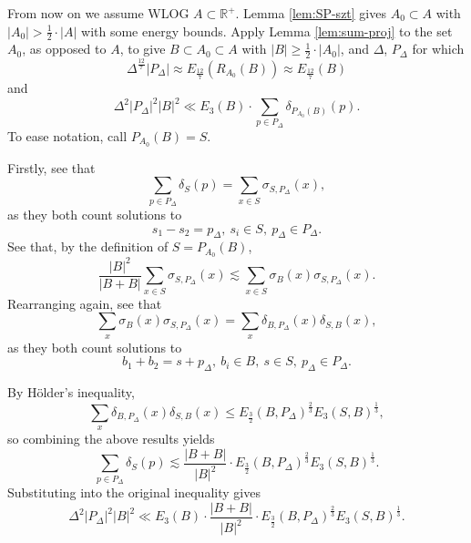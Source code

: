\documentclass[reqno]{amsart}
\newcommand{\holder}{H\"older}
\numberwithin{equation}{section}
\begin{document}
From now on we assume WLOG \(A \subset \mathbb{R} ^{+}\).
Lemma \ref{lem:SP-szt} gives \(A_0 \subset A\) with \(\left\lvert A_0 \right\rvert > \frac{1}{2} \cdot \left\lvert A \right\rvert \) with some energy bounds.
Apply Lemma \ref{lem:sum-proj} to the set \(A_0\), as opposed to \(A\), to give \(B \subset A_0 \subset A\) with
\(\left\lvert B \right\rvert \geq \frac{1}{2} \cdot \left\lvert A_0 \right\rvert \), and \(\Delta\), \(P_{\Delta} \) for which
\[
    \Delta^{\frac{12}{7} } \left\lvert P_{\Delta}  \right\rvert \approx E_{\frac{12}{7} } \left( R_{A_0} (B) \right) \approx E_{\frac{12}{7} } (B) 
\]
and
\[
    \Delta ^{2} \left\lvert P_{\Delta}  \right\rvert ^{2} \left\lvert B \right\rvert ^{2} \ll E_3(B) \cdot \sum _{p \in P_{\Delta} } \delta_{P_{A_0} (B)} (p)
.\]
To ease notation, call \(P_{A_0} (B)= S\).

Firstly, see that
\[
    \sum _{p \in P_{\Delta} } \delta_{S} (p) = \sum _{x \in S} \sigma_{S, P_{\Delta} }(x) 
,\]
as they both count solutions to
\[
    s_1-s_2  = p_{\Delta} ,~ s_{i}  \in S ,~ p_{\Delta} \in P_{\Delta} 
.\]
See that, by the definition of \(S = P_{A_0} (B)\),
\[
    \frac{\left\lvert B \right\rvert ^{2} }{\left\lvert B + B \right\rvert} \sum _{x \in S} \sigma_{S, P_{\Delta} } (x) \lesssim \sum _{x \in S} \sigma_{B} (x) \sigma_{S,P_{\Delta} }(x) 
.\]
Rearranging again, see that
\[
    \sum _{x} \sigma_{B} (x) \sigma_{S , P_{\Delta} } (x) = \sum _{x} \delta_{B,P_{\Delta} } (x) \delta_{S, B} (x)
,\]
as they both count solutions to
\[
    b_1 + b_2 = s + p_{\Delta} ,~ b_{i} \in B,~ s  \in S ,~ p_{\Delta} \in P_{\Delta} 
.\]

By \holder's inequality,
\[
    \sum _{x} \delta_{B,P_{\Delta} } (x) \delta_{S,B} (x) \leq E_{\frac{3}{2} } (B,P_{\Delta} )^{\frac{2}{3} } E_{3} (S,B)^{\frac{1}{3} }
,\]
so combining the above results yields
\[
    \sum _{p \in P_{\Delta} } \delta_{S} (p) \lesssim \frac{\left\lvert B+B \right\rvert }{\left\lvert B \right\rvert ^{2}}\cdot  E_{\frac{3}{2} } (B,P_{\Delta} )^{\frac{2}{3} } E_{3} (S,  B)^{\frac{1}{3} }
.\]
Substituting into the original inequality gives
\begin{equation} \label{eq:SP-from-lemma}
    \Delta ^{2}\left\lvert P_{\Delta}  \right\rvert ^{2} \left\lvert B \right\rvert ^{2} \ll E_3(B) \cdot \frac{\left\lvert B+B \right\rvert }{\left\lvert B \right\rvert ^{2}} \cdot E_{\frac{3}{2} } (B,P_{\Delta} )^{\frac{2}{3} } E_3(S,B)^{\frac{1}{3} }.
\end{equation}
\end{document}
